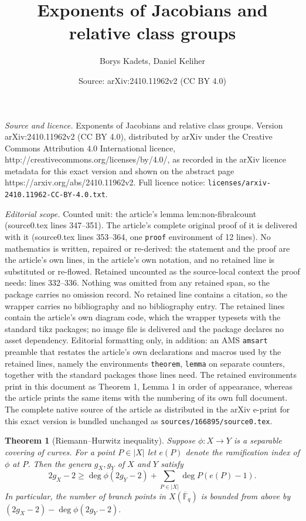 \documentclass[10pt,a4paper]{amsart}
\title{Exponents of Jacobians and relative class groups}
\author{Borys Kadets, Daniel Keliher}
\date{Source: arXiv:2410.11962v2 (CC BY 4.0)}
\newtheorem{theorem}{Theorem}
\newcommand{\F}{\mathbb{F}}
\newcommand{\Fbar}{{\overline{\F}}}
\begin{document}
\maketitle

\noindent\emph{Source and licence.} Exponents of Jacobians and relative class groups. Version arXiv:2410.11962v2 (CC BY 4.0), distributed by arXiv under the Creative Commons Attribution 4.0 International licence, http://creativecommons.org/licenses/by/4.0/, as recorded in the arXiv licence metadata for this exact version and shown on the abstract page https://arxiv.org/abs/2410.11962v2. Full licence notice: \texttt{licenses/arxiv-2410.11962-CC-BY-4.0.txt}.\par\smallskip

\noindent\textit{Editorial scope.} Counted unit: the article's lemma lem:non-fibralcount (source0.tex lines 347--351). The article's complete original proof of it is delivered with it (source0.tex lines 353--364, one \texttt{proof} environment of 12 lines). No mathematics is written, repaired or re-derived: the statement and the proof are the article's own lines, in the article's own notation, and no retained line is substituted or re-flowed.  Retained uncounted as the source-local context the proof needs: lines 332--336.  Nothing was omitted from any retained span, so the package carries no omission record.  No retained line contains a citation, so the wrapper carries no bibliography and no bibliography entry.  The retained lines contain the article's own diagram code, which the wrapper typesets with the standard tikz packages; no image file is delivered and the package declares no asset dependency.  Editorial formatting only, in addition: an AMS \texttt{amsart} preamble that restates the article's own declarations and macros used by the retained lines, namely the environments \texttt{theorem}, \texttt{lemma} on separate counters, together with the standard packages those lines need.  The retained environments print in this document as Theorem 1, Lemma 1 in order of appearance, whereas the article prints the same items with the numbering of its own full document.  The complete native source of the article as distributed in the arXiv e-print for this exact version is bundled unchanged as \texttt{sources/166895/source0.tex}.
\begin{theorem}[Riemann--Hurwitz inequality]\label{thm:RH}
    Suppose $\phi: X \to Y$ is a separable covering of curves. For a point $P \in |X|$ let $e(P)$ denote the ramification index of $\phi$ at $P$. Then the genera $g_X, g_Y$ of $X$ and $Y$ satisfy 
    \[2g_X-2 \geqslant \deg \phi(2g_Y-2)+\sum_{P \in |X|}\deg P(e(P)-1).\]
    In particular, the number of branch points in $X(\Fbar_q)$ is bounded from above by $(2g_X-2)-\deg \phi (2g_Y-2).$
\end{theorem}
\end{document}
